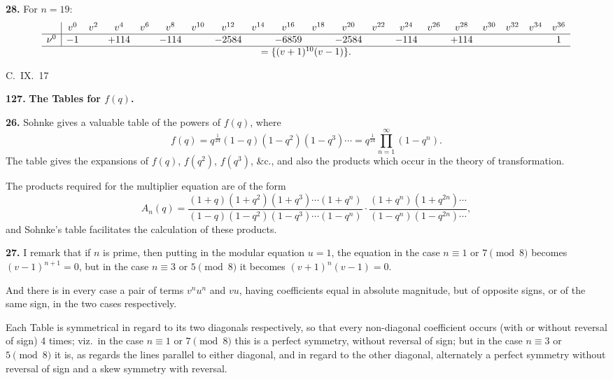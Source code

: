 \documentclass[11pt,a4paper]{book}
\begin{document}
\medskip
\noindent\textbf{28.} For $n = 19$:
\[
\begin{array}{r|ccccccccccccccccccc}
& v^0 & v^2 & v^4 & v^6 & v^8 & v^{10} & v^{12} & v^{14} & v^{16} & v^{18} & v^{20} & v^{22} & v^{24} & v^{26} & v^{28} & v^{30} & v^{32} & v^{34} & v^{36} \\
\hline
\nu^0 & -1 & & +114 & & -114 & & -2584 & & -6859 & & -2584 & & -114 & & +114 & & & & 1 \\
\hline
\multicolumn{20}{c}{= \{(v + 1)^{10}(v - 1)\}.}
\end{array}
\]

\begin{flushright}
C.~IX.~17
\end{flushright}


\noindent\textbf{127.} \textbf{The Tables for $f(q)$.}

\medskip
\noindent\textbf{26.} Sohnke gives a valuable table of the powers of $f(q)$, where
\[
f(q) = q^{\frac{1}{24}}(1 - q)(1 - q^2)(1 - q^3)\cdots = q^{\frac{1}{24}}\prod_{n=1}^{\infty}(1 - q^n).
\]
The table gives the expansions of $f(q)$, $f(q^2)$, $f(q^3)$, \&c., and also the products which occur in the theory of transformation.

The products required for the multiplier equation are of the form
\[
A_n(q) = \frac{(1 + q)(1 + q^2)(1 + q^3)\cdots(1 + q^n)}{(1 - q)(1 - q^2)(1 - q^3)\cdots(1 - q^n)} \cdot \frac{(1 + q^n)(1 + q^{2n})\cdots}{(1 - q^n)(1 - q^{2n})\cdots},
\]
and Sohnke's table facilitates the calculation of these products.

\medskip
\noindent\textbf{27.} I remark that if $n$ is prime, then putting in the modular equation $u = 1$, the equation in the case $n \equiv 1$ or $7 \pmod{8}$ becomes $(v - 1)^{n+1} = 0$, but in the case $n \equiv 3$ or $5 \pmod{8}$ it becomes $(v + 1)^n(v - 1) = 0$.

And there is in every case a pair of terms $v^n u^n$ and $vu$, having coefficients equal in absolute magnitude, but of opposite signs, or of the same sign, in the two cases respectively.

Each Table is symmetrical in regard to its two diagonals respectively, so that every non-diagonal coefficient occurs (with or without reversal of sign) 4 times; viz.\ in the case $n \equiv 1$ or $7 \pmod{8}$ this is a perfect symmetry, without reversal of sign; but in the case $n \equiv 3$ or $5 \pmod{8}$ it is, as regards the lines parallel to either diagonal, and in regard to the other diagonal, alternately a perfect symmetry without reversal of sign and a skew symmetry with reversal.
\end{document}
